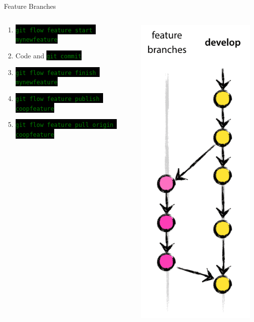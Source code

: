 \documentclass[
14pt,
aspectratio=169,
usenames,
dvipsnames,
x11names]{beamer}
\newcommand{\code}[1]{{\small\colorbox{black}{\textcolor{green}{\texttt{#1}}}}}
\begin{document}
\begin{frame}{Feature Branches}
  \begin{columns}
    \begin{column}{.7\linewidth}
      \minipage[c][0.75\textheight][s]{\columnwidth}
      \begin{enumerate} \setlength{\itemsep}{\fill}
      \item \code{git flow feature start mynewfeature}
      \item Code and \code{git commit}
      \item \code{git flow feature finish  mynewfeature}
      \item \code{git flow feature publish coopfeature}
      \item \code{git flow feature pull origin coopfeature}
      \end{enumerate}
      \endminipage
    \end{column}
    \begin{column}{.3\linewidth}
      \centering
      \includegraphics[width=.55\textwidth]{feature-branch}
    \end{column}
  \end{columns}
\end{frame}
\end{document}
